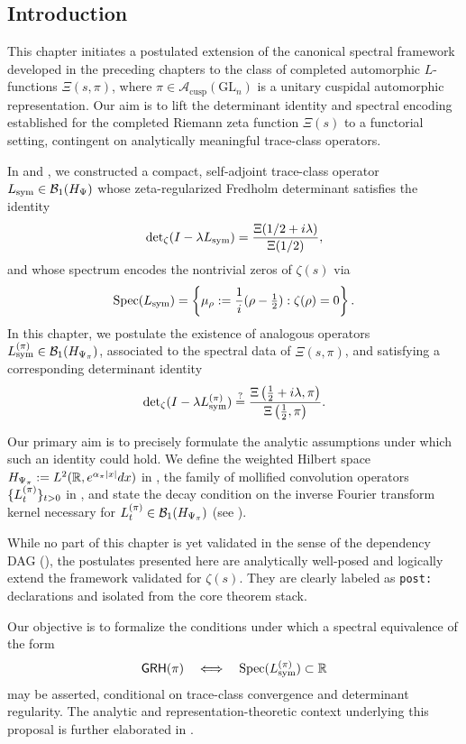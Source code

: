 \subsection{Introduction}

This chapter initiates a postulated extension of the canonical spectral framework developed in the preceding chapters to the class of completed automorphic \( L \)-functions \( \Xi(s, \pi) \), where \( \pi \in \mathcal{A}_{\mathrm{cusp}}(\mathrm{GL}_n) \) is a unitary cuspidal automorphic representation. Our aim is to lift the determinant identity and spectral encoding established for the completed Riemann zeta function \( \Xi(s) \) to a functorial setting, contingent on analytically meaningful trace-class operators.

In  and , we constructed a compact, self-adjoint trace-class operator \( L_{\mathrm{sym}} \in \mathcal{B}_1(H_{\Psi}) \) whose zeta-regularized Fredholm determinant satisfies the identity
\[
\det\nolimits_{\zeta}(I - \lambda L_{\mathrm{sym}}) = \frac{\Xi(1/2 + i\lambda)}{\Xi(1/2)},
\]
and whose spectrum encodes the nontrivial zeros of \( \zeta(s) \) via
\[
\operatorname{Spec}(L_{\mathrm{sym}}) = \left\{ \mu_\rho := \frac{1}{i}(\rho - \tfrac{1}{2}) : \zeta(\rho) = 0 \right\}.
\]
In this chapter, we postulate the existence of analogous operators \( L_{\mathrm{sym}}^{(\pi)} \in \mathcal{B}_1(H_{\Psi_{\pi}}) \), associated to the spectral data of \( \Xi(s, \pi) \), and satisfying a corresponding determinant identity
\[
\det\nolimits_{\zeta}(I - \lambda L_{\mathrm{sym}}^{(\pi)}) \overset{?}{=} \frac{\Xi\left(\tfrac{1}{2} + i\lambda, \pi\right)}{\Xi\left(\tfrac{1}{2}, \pi\right)}.
\]

Our primary aim is to precisely formulate the analytic assumptions under which such an identity could hold. We define the weighted Hilbert space \( H_{\Psi_{\pi}} := L^2(\mathbb{R}, e^{\alpha_{\pi} |x|} dx) \) in , the family of mollified convolution operators \( \{ L_t^{(\pi)} \}_{t > 0} \) in , and state the decay condition on the inverse Fourier transform kernel necessary for \( L_t^{(\pi)} \in \mathcal{B}_1(H_{\Psi_{\pi}}) \) (see ).

While no part of this chapter is yet validated in the sense of the dependency DAG (), the postulates presented here are analytically well-posed and logically extend the framework validated for \( \zeta(s) \). They are clearly labeled as \texttt{post:} declarations and isolated from the core theorem stack.

Our objective is to formalize the conditions under which a spectral equivalence of the form
\[
\mathsf{GRH}(\pi) \quad \Longleftrightarrow \quad \operatorname{Spec}(L_{\mathrm{sym}}^{(\pi)}) \subset \mathbb{R}
\]
may be asserted, conditional on trace-class convergence and determinant regularity. The analytic and representation-theoretic context underlying this proposal is further elaborated in .
